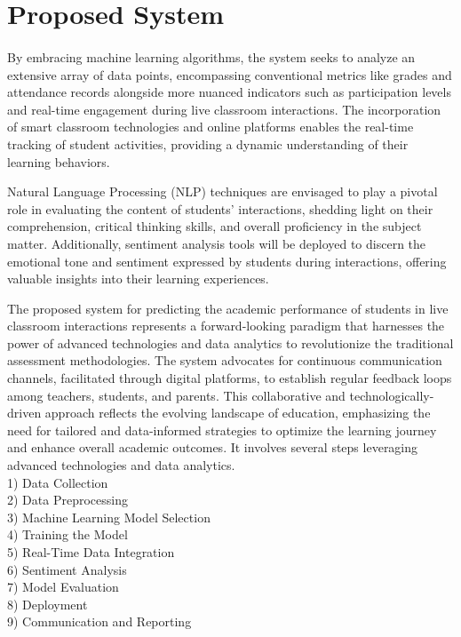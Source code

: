 \section{Proposed System}
\paragraph{}
By embracing machine learning algorithms, the system seeks to analyze an extensive array of data points, encompassing conventional metrics like grades and attendance records alongside more nuanced indicators such as participation levels and real-time engagement during live classroom interactions. The incorporation of smart classroom technologies and online platforms enables the real-time tracking of student activities, providing a dynamic understanding of their learning behaviors.
\par Natural Language Processing (NLP) techniques are envisaged to play a pivotal role in evaluating the content of students' interactions, shedding light on their comprehension, critical thinking skills, and overall proficiency in the subject matter. Additionally, sentiment analysis tools will be deployed to discern the emotional tone and sentiment expressed by students during interactions, offering valuable insights into their learning experiences. 
\par The proposed system for predicting the academic performance of students in live classroom interactions represents a forward-looking paradigm that harnesses the power of advanced technologies and data analytics to revolutionize the traditional assessment methodologies. The system advocates for continuous communication channels, facilitated through digital platforms, to establish regular feedback loops among teachers, students, and parents. This collaborative and technologically-driven approach reflects the evolving landscape of education, emphasizing the need for tailored and data-informed strategies to optimize the learning journey and enhance overall academic outcomes. It involves several steps leveraging advanced technologies and data analytics. 
\\
1) Data Collection
\\
2) Data Preprocessing
\\
3) Machine Learning Model Selection
\\
4) Training the Model
\\
5) Real-Time Data Integration
\\
6) Sentiment Analysis
\\
7) Model Evaluation
\\
8) Deployment
\\
9) Communication and Reporting

